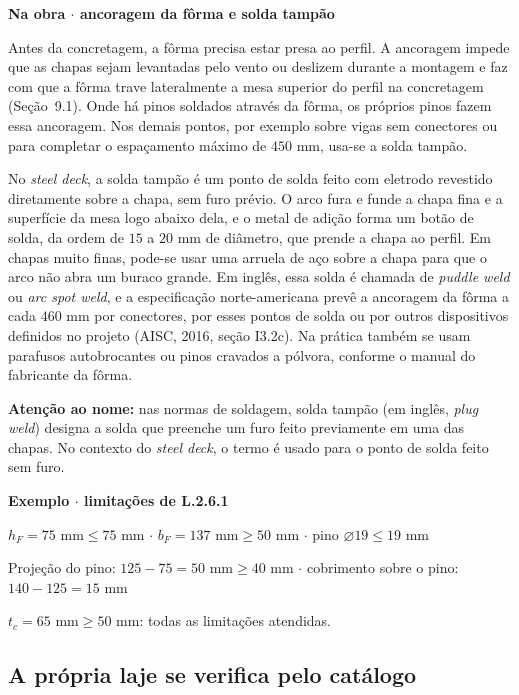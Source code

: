 \documentclass[11pt,a4paper]{article}
\newcommand{\caixaconceito}[2]{%
  \par\vspace{6pt}\noindent\colorbox{calloutbg}{%
    \parbox{\dimexpr\linewidth-2\fboxsep\relax}{%
      \vspace{4pt}\textbf{\color{primary}#1}\par\vspace{3pt}#2\vspace{4pt}%
    }%
  }\par\vspace{6pt}%
}
\newcommand{\caixaexemplo}[2]{%
  \par\vspace{6pt}\noindent\colorbox{examplebg}{%
    \parbox{\dimexpr\linewidth-2\fboxsep\relax}{%
      \vspace{4pt}\textbf{\color{exampleaccent}#1}\par\vspace{3pt}#2\vspace{4pt}%
    }%
  }\par\vspace{6pt}%
}
\begin{document}
\caixaconceito{Na obra $\cdot$ ancoragem da fôrma e solda tampão}{%
Antes da concretagem, a fôrma precisa estar presa ao perfil. A ancoragem impede que as chapas sejam levantadas pelo vento ou deslizem durante a montagem e faz com que a fôrma trave lateralmente a mesa superior do perfil na concretagem (Seção~9.1). Onde há pinos soldados através da fôrma, os próprios pinos fazem essa ancoragem. Nos demais pontos, por exemplo sobre vigas sem conectores ou para completar o espaçamento máximo de $450\text{ mm}$, usa-se a solda tampão.\par\vspace{4pt}
No \textit{steel deck}, a solda tampão é um ponto de solda feito com eletrodo revestido diretamente sobre a chapa, sem furo prévio. O arco fura e funde a chapa fina e a superfície da mesa logo abaixo dela, e o metal de adição forma um botão de solda, da ordem de $15$ a $20\text{ mm}$ de diâmetro, que prende a chapa ao perfil. Em chapas muito finas, pode-se usar uma arruela de aço sobre a chapa para que o arco não abra um buraco grande. Em inglês, essa solda é chamada de \textit{puddle weld} ou \textit{arc spot weld}, e a especificação norte-americana prevê a ancoragem da fôrma a cada $460\text{ mm}$ por conectores, por esses pontos de solda ou por outros dispositivos definidos no projeto (AISC, 2016, seção I3.2c). Na prática também se usam parafusos autobrocantes ou pinos cravados a pólvora, conforme o manual do fabricante da fôrma.\par\vspace{4pt}
\textbf{Atenção ao nome:} nas normas de soldagem, solda tampão (em inglês, \textit{plug weld}) designa a solda que preenche um furo feito previamente em uma das chapas. No contexto do \textit{steel deck}, o termo é usado para o ponto de solda feito sem furo.}

\caixaexemplo{Exemplo $\cdot$ limitações de L.2.6.1}{%
$h_F = 75\text{ mm} \le 75\text{ mm}$ $\cdot$ $b_F = 137\text{ mm} \ge 50\text{ mm}$ $\cdot$ pino $\varnothing 19 \le 19\text{ mm}$\par
Projeção do pino: $125 - 75 = 50\text{ mm} \ge 40\text{ mm}$ $\cdot$ cobrimento sobre o pino: $140 - 125 = 15\text{ mm}$\par
$t_c = 65\text{ mm} \ge 50\text{ mm}$: todas as limitações atendidas.}

\subsection{A própria laje se verifica pelo catálogo}
\end{document}
